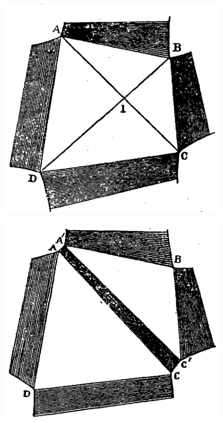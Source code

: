 \documentclass[12pt]{article}
\begin{document}
\begin{figure}[h]
\centering
\begin{minipage}{.3\textwidth}
  \centering
  \includegraphics[width=\linewidth]{fig_4}
  \label{fig_4}
\end{minipage}%
\begin{minipage}{.3\textwidth}
  \centering
  \includegraphics[width=\linewidth]{fig_5}
  \label{fig_5}
\end{minipage}
\end{figure}
\end{document}
